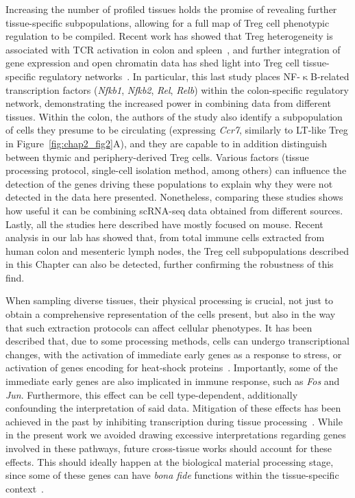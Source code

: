 Increasing the number of profiled tissues holds the promise of revealing further tissue-specific subpopulations, allowing for a full map of Treg cell phenotypic regulation to be compiled. Recent work has showed that Treg heterogeneity is associated with TCR activation in colon and spleen~\citep{zemmour_single-cell_2018}, and further integration of gene expression and open chromatin data has shed light into Treg cell tissue-specific regulatory networks~\citep{dispirito_molecular_2018}. In particular, this last study places NF-${\upkappa}$B-related transcription factors (\textit{Nfkb1}, \textit{Nfkb2}, \textit{Rel}, \textit{Relb}) within the colon-specific regulatory network, demonstrating the increased power in combining data from different tissues. Within the colon, the authors of the study also identify a subpopulation of cells they presume to be circulating (expressing \textit{Ccr7}, similarly to LT-like Treg in Figure~\ref{fig:chap2_fig2}A), and they are capable to in addition distinguish between thymic and periphery-derived Treg cells. Various factors (tissue processing protocol, single-cell isolation method, among others) can influence the detection of the genes driving these populations to explain why they were not detected in the data here presented. Nonetheless, comparing these studies shows how useful it can be combining scRNA-seq data obtained from different sources. Lastly, all the studies here described have mostly focused on mouse. Recent analysis in our lab has showed that, from total immune cells extracted from human colon and mesenteric lymph nodes, the Treg cell subpopulations described in this Chapter can also be detected, further confirming the robustness of this find.

When sampling diverse tissues, their physical processing is crucial, not just to obtain a comprehensive representation of the cells present, but also in the way that such extraction protocols can affect cellular phenotypes. It has been described that, due to some processing methods, cells can undergo transcriptional changes, with the activation of immediate early genes as a response to stress, or activation of genes encoding for heat-shock proteins~\citep{Van_den_Brink2017-lg}. Importantly, some of the immediate early genes are also implicated in immune response, such as \textit{Fos} and \textit{Jun}. Furthermore, this effect can be cell type-dependent, additionally confounding the interpretation of said data. Mitigation of these effects has been achieved in the past by inhibiting transcription during tissue processing~\citep{Wu2017-jn}. While in the present work we avoided drawing excessive interpretations regarding genes involved in these pathways, future cross-tissue works should account for these effects. This should ideally happen at the biological material processing stage, since some of these genes can have \textit{bona fide} functions within the tissue-specific context~\citep{wheaton_junb_2019}.

